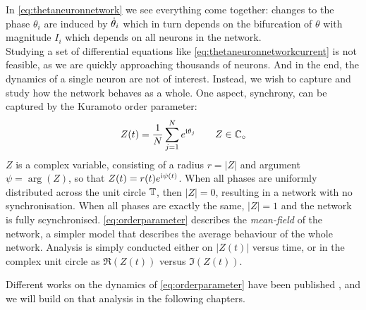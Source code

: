 In \eqref{eq:thetaneuronnetwork} we see everything come together: changes to the phase $\theta_i$ are induced by ${\dot{\theta}}_i$ which in turn depends on the bifurcation of $\theta$ with magnitude $I_i$ which depends on all neurons in the network. \\


Studying a set of differential equations like \eqref{eq:thetaneuronnetworkcurrent} is not feasible, as we are quickly approaching thousands of neurons. And in the end, the dynamics of a single neuron are not of interest. Instead, we wish to capture and study how the network behaves as a whole. One aspect, synchrony, can be captured by the Kuramoto order parameter:
\begin{align}
Z(t) = \frac{1}{N} \sum_{j=1}^N e^{{\rm{i}}\theta_j}  \qquad Z \in \mathbb{C}_\circ \label{eq:orderparameter}
\end{align}
$Z$ is a complex variable, consisting of a radius $r = \rvert Z \rvert$ and argument $\psi = \arg \left( Z \right)$, so that $Z(t) = r(t) e^{{\rm{i}} \psi(t)}$. When all phases are uniformly distributed across the unit circle ${\mathbb{T}}$, then $\rvert Z \rvert = 0$, resulting in a network with no synchronisation. When all phases are exactly the same, $\rvert Z \rvert = 1$ and the network is fully scynchronised. \eqref{eq:orderparameter} describes the \textsl{mean-field} of the network, a simpler model that describes the average behaviour of the whole network. Analysis is simply conducted either on $ \rvert Z(t) \rvert$ versus time, or in the complex unit circle as $\Re (Z(t))$ versus $\Im (Z(t))$.

Different works on the dynamics of \eqref{eq:orderparameter} have been published \cite{Luke2013, Martens2020}, and we will build on that analysis in the following chapters.


